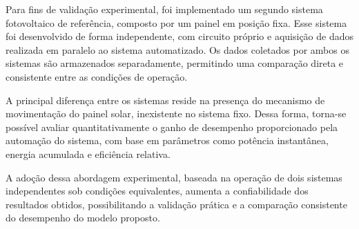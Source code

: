 Para fins de validação experimental, foi implementado um segundo sistema fotovoltaico de referência, composto por um painel em posição fixa. Esse sistema foi desenvolvido de forma independente, com circuito próprio e aquisição de dados realizada em paralelo ao sistema automatizado. Os dados coletados por ambos os sistemas são armazenados separadamente, permitindo uma comparação direta e consistente entre as condições de operação.

A principal diferença entre os sistemas reside na presença do mecanismo de movimentação do painel solar, inexistente no sistema fixo. Dessa forma, torna-se possível avaliar quantitativamente o ganho de desempenho proporcionado pela automação do sistema, com base em parâmetros como potência instantânea, energia acumulada e eficiência relativa.

A adoção dessa abordagem experimental, baseada na operação de dois sistemas independentes sob condições equivalentes, aumenta a confiabilidade dos resultados obtidos, possibilitando a validação prática e a comparação consistente do desempenho do modelo proposto.

